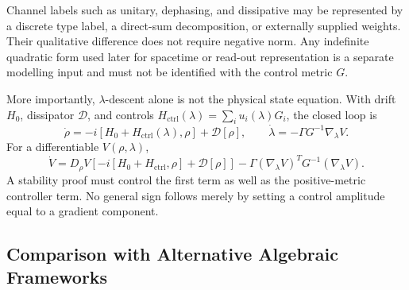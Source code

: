 \documentclass[aps,pre,onecolumn,superscriptaddress,floatfix,longbibliography]{revtex4-2}
\begin{document}
Channel labels such as unitary, dephasing, and dissipative may be represented by a discrete type label, a direct-sum decomposition, or externally supplied weights.  Their qualitative difference does not require negative norm.  Any indefinite quadratic form used later for spacetime or read-out representation is a separate modelling input and must not be identified with the control metric $G$.

More importantly, $\lambda$-descent alone is not the physical state equation.  With drift $H_0$, dissipator $\mathcal D$, and controls $H_{\mathrm{ctrl}}(\lambda)=\sum_i u_i(\lambda)G_i$, the closed loop is
\begin{equation}
\dot\rho= -i[H_0+H_{\mathrm{ctrl}}(\lambda),\rho]+\mathcal D[\rho],
\qquad
\dot\lambda=-\Gamma G^{-1}\nabla_\lambda V.
\end{equation}
For a differentiable $V(\rho,\lambda)$,
\begin{equation}
\dot V=D_\rho V\!\left[-i[H_0+H_{\mathrm{ctrl}},\rho]+\mathcal D[\rho]\right]
-\Gamma(\nabla_\lambda V)^TG^{-1}(\nabla_\lambda V).
\end{equation}
A stability proof must control the first term as well as the positive-metric controller term.  No general sign follows merely by setting a control amplitude equal to a gradient component.

\subsection{Comparison with Alternative Algebraic Frameworks}
\label{sec:exclusion}

\begin{table}[h]
\centering
{}
\caption{Candidate control frameworks after separating the positive Lyapunov metric $G$ from any Clifford/read-out form $q$.}
\label{tab:exclusion}
\end{table}
\end{document}
